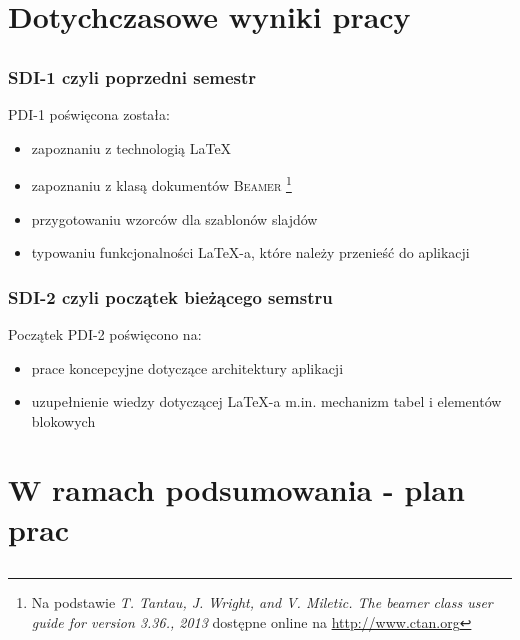 \documentclass[t]{beamer}
\newcommand{\beamer}{
{\rmfamily\textsc{Beamer}}
}
\begin{document}
\section{Dotychczasowe wyniki pracy}
\subsection{}

\begin{frame}
	\frametitle{SDI-1 czyli poprzedni semestr}
		PDI-1 poświęcona została:
		\begin{itemize}
			\item zapoznaniu z technologią \LaTeX\ 
			\item zapoznaniu z klasą dokumentów \beamer\footnote{Na podstawie \emph{T. Tantau, J. Wright, and V. Miletic. The beamer class user guide for version 3.36., 2013 } dostępne online na \url{http://www.ctan.org}}
			\item przygotowaniu wzorców dla szablonów slajdów
			\item typowaniu funkcjonalności \LaTeX-a, które należy przenieść do aplikacji
		\end{itemize}
\end{frame}

\begin{frame}
	\frametitle{SDI-2 czyli początek bieżącego semstru}
	Początek PDI-2 poświęcono na:
	\begin{itemize}
		\item prace koncepcyjne dotyczące architektury aplikacji
		\item uzupełnienie wiedzy dotyczącej \LaTeX-a m.in. mechanizm tabel i elementów blokowych
	\end{itemize}
\end{frame}

\section{W ramach podsumowania - plan prac}
\subsection{}
\end{document}

